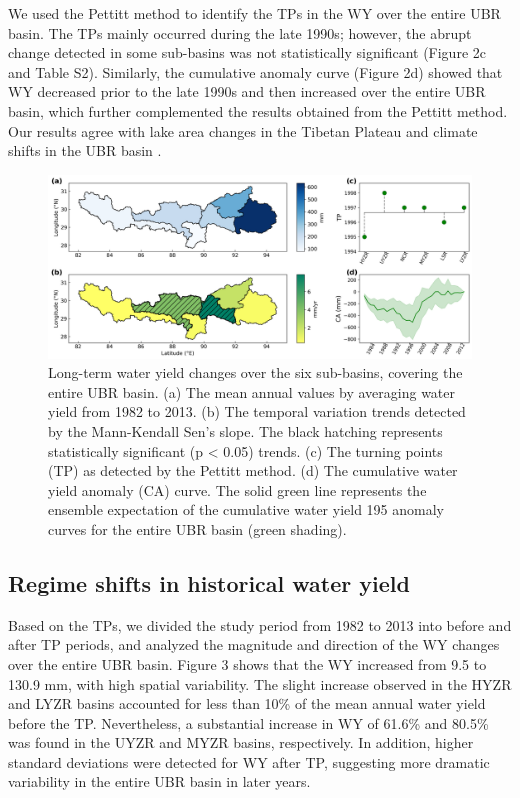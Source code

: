 \documentclass[hess, manuscript]{copernicus}
\begin{document}
We used the Pettitt method to identify the TPs in the WY over the entire UBR basin. The TPs mainly occurred during the late 1990s; however, the abrupt change detected in some sub-basins was not statistically significant (Figure 2c and Table S2). Similarly, the cumulative anomaly curve (Figure 2d) showed that WY decreased prior to the late 1990s and then increased over the entire UBR basin, which further complemented the results obtained from the Pettitt method. Our results agree with lake area changes in the Tibetan Plateau \citep{zhang2017} and climate shifts in the UBR basin \citep{li2019spatiotemporal}.

\begin{figure}[t]
\includegraphics[width=12cm]{01-figures/Fig.2.png}
\caption{Long-term water yield changes over the six sub-basins, covering the entire UBR basin. (a) The mean annual values by
averaging water yield from 1982 to 2013. (b) The temporal variation trends detected by the Mann-Kendall Sen’s slope. The black
hatching represents statistically significant (p < 0.05) trends. (c) The turning points (TP) as detected by the Pettitt method. (d) The
cumulative water yield anomaly (CA) curve. The solid green line represents the ensemble expectation of the cumulative water yield
195 anomaly curves for the entire UBR basin (green shading).}
\label{fig:water-yield}
\end{figure}

\subsection{Regime shifts in historical water yield}
Based on the TPs, we divided the study period from 1982 to 2013 into before and after TP periods, and analyzed the magnitude and direction of the WY changes over the entire UBR basin. Figure 3 shows that the WY increased from 9.5 to 130.9 mm, with high spatial variability. The slight increase observed in the HYZR and LYZR basins accounted for less than 10\% of the mean annual water yield before the TP. Nevertheless, a substantial increase in WY of 61.6\% and 80.5\% was found in the UYZR and MYZR basins, respectively. In addition, higher standard deviations were detected for WY after TP, suggesting more dramatic variability in the entire UBR basin in later years.
\end{document}
